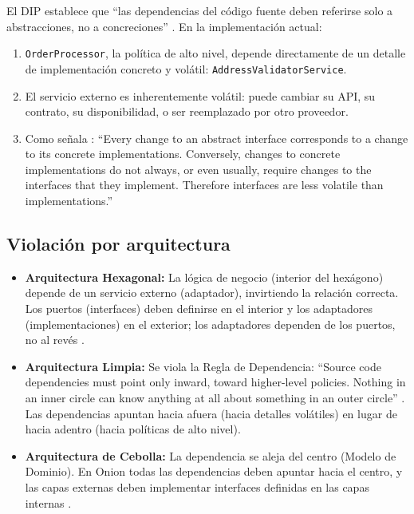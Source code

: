 El DIP establece que \enquote{las dependencias del código fuente deben referirse solo a abstracciones, no a concreciones} . En la implementación actual:

\begin{enumerate}
    \item \texttt{OrderProcessor}, la política de alto nivel, depende directamente de un detalle de implementación concreto y volátil: \texttt{AddressValidatorService}.
    \item El servicio externo es inherentemente volátil: puede cambiar su API, su contrato, su disponibilidad, o ser reemplazado por otro proveedor.
    \item Como señala \citet[p.~88]{martin2017}: \enquote{Every change to an abstract interface corresponds to a change to its concrete implementations. Conversely, changes to concrete implementations do not always, or even usually, require changes to the interfaces that they implement. Therefore interfaces are less volatile than implementations.}
\end{enumerate}

\subsection*{Violación por arquitectura}

\begin{itemize}
    \item \textbf{Arquitectura Hexagonal:} La lógica de negocio (interior del hexágono) depende de un servicio externo (adaptador), invirtiendo la relación correcta. Los puertos (interfaces) deben definirse en el interior y los adaptadores (implementaciones) en el exterior; los adaptadores dependen de los puertos, no al revés \citep[«Nature of the Solution»]{cockburn2005}.
    \item \textbf{Arquitectura Limpia:} Se viola la Regla de Dependencia: \enquote{Source code dependencies must point only inward, toward higher-level policies. Nothing in an inner circle can know anything at all about something in an outer circle} . Las dependencias apuntan hacia afuera (hacia detalles volátiles) en lugar de hacia adentro (hacia políticas de alto nivel).
    \item \textbf{Arquitectura de Cebolla:} La dependencia se aleja del centro (Modelo de Dominio). En Onion todas las dependencias deben apuntar hacia el centro, y las capas externas deben implementar interfaces definidas en las capas internas .
\end{itemize}

